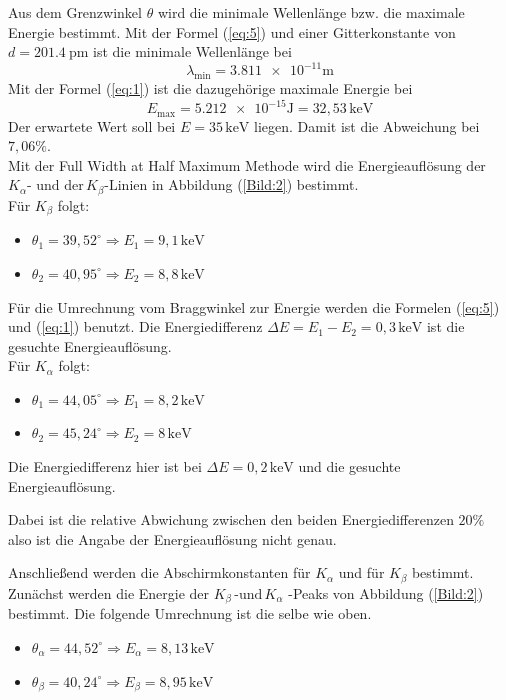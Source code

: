 Aus dem Grenzwinkel $\theta$ wird die minimale Wellenlänge bzw. die maximale Energie bestimmt.
Mit der Formel (\ref{eq:5}) und einer Gitterkonstante von $d= \SI{201.4}{\pico\meter}$  ist die minimale Wellenlänge bei
\begin{equation*}
  \lambda_{\text{min}} = \num{3.811e-11} \text{m}
\end{equation*}
Mit der Formel (\ref{eq:1}) ist die dazugehörige maximale Energie bei
\begin{equation*}
  E_{\text{max}} = \num{5.212e-15} \text{J} = 32,53 \, \text{keV}
\end{equation*}
Der erwartete Wert soll bei $E = 35 \,\text{keV}$ liegen.
Damit ist die Abweichung bei $7,06 \%$.\\

Mit der Full Width at Half Maximum Methode wird die Energieauflösung der $K_\alpha \text{- und der} \, K_\beta \text{-Linien}$ in Abbildung (\ref{Bild:2}) bestimmt.\\
Für $K_\beta$ folgt:
\begin{itemize}
  \item $\theta_1 = 39,52^\circ \Rightarrow E_1 = 9,1 \, \text{keV}$
  \item $\theta_2 = 40,95^\circ \Rightarrow E_2 = 8,8 \, \text{keV}$
\end{itemize}
Für die Umrechnung vom Braggwinkel zur Energie werden die Formelen (\ref{eq:5}) und (\ref{eq:1}) benutzt.
Die Energiedifferenz $\Delta E = E_1 - E_2 = 0,3 \, \text{keV}$ ist die gesuchte Energieauflösung.\\

Für $K_\alpha$ folgt:
\begin{itemize}
  \item $\theta_1 = 44,05^\circ \Rightarrow E_1 = 8,2 \, \text{keV}$
  \item $\theta_2 = 45,24^\circ \Rightarrow E_2 = 8 \, \text{keV}$
\end{itemize}
Die Energiedifferenz hier ist bei $\Delta E = 0,2 \,\text{keV}$ und die gesuchte Energieauflösung.

Dabei ist die relative Abwichung zwischen den beiden Energiedifferenzen $20 \%$ also
ist die Angabe der Energieauflösung nicht genau.

Anschließend werden die Abschirmkonstanten für $K_\alpha$ und für $K_\beta$ bestimmt.
Zunächst werden die Energie der $K_\beta \, \text{-und}\, K_\alpha$ -Peaks von Abbildung (\ref{Bild:2}) bestimmt.
Die folgende Umrechnung ist die selbe wie oben.
\begin{itemize}
  \item $\theta_\alpha = 44,52^\circ \Rightarrow E_\alpha = 8,13 \,\text{keV}$
  \item $\theta_\beta = 40,24^\circ \Rightarrow E_\beta = 8,95 \,\text{keV}$
\end{itemize}


